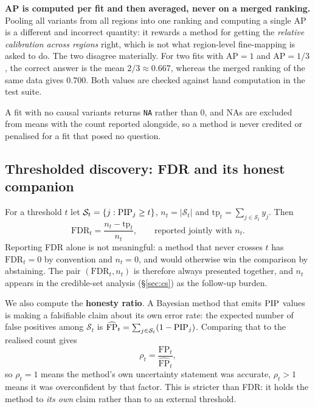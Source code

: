 \textbf{AP is computed per fit and then averaged, never on a merged ranking.}
Pooling all variants from all regions into one ranking and computing a single
AP is a different and incorrect quantity: it rewards a method for getting the
\emph{relative calibration across regions} right, which is not what
region-level fine-mapping is asked to do. The two disagree materially. For two
fits with $\mathrm{AP}=1$ and $\mathrm{AP}=1/3$, the correct answer is the mean
$2/3\approx0.667$, whereas the merged ranking of the same data gives $0.700$.
Both values are checked against hand computation in the test suite.

A fit with no causal variants returns \texttt{NA} rather than $0$, and NAs are
excluded from means with the count reported alongside, so a method is never
credited or penalised for a fit that posed no question.

\subsection{Thresholded discovery: FDR and its honest companion}\label{sec:fdr}

For a threshold $t$ let $\mathcal{S}_t=\{j:\mathrm{PIP}_j\ge t\}$, $n_t=|\mathcal{S}_t|$
and $\mathrm{tp}_t=\sum_{j\in\mathcal{S}_t}y_j$. Then
\begin{equation}
\mathrm{FDR}_t=\frac{n_t-\mathrm{tp}_t}{n_t},\qquad
\text{reported jointly with } n_t .
\end{equation}
Reporting FDR alone is not meaningful: a method that never crosses $t$ has
$\mathrm{FDR}_t=0$ by convention and $n_t=0$, and would otherwise win the
comparison by abstaining. The pair $(\mathrm{FDR}_t,n_t)$ is therefore always
presented together, and $n_t$ appears in the credible-set analysis
(\S\ref{sec:cs}) as the follow-up burden.

We also compute the \textbf{honesty ratio}. A Bayesian method that emits $\mathrm{PIP}$
values is making a falsifiable claim about its own error rate: the expected
number of false positives among $\mathcal{S}_t$ is
$\widehat{\mathrm{FP}}_t=\sum_{j\in\mathcal{S}_t}(1-\mathrm{PIP}_j)$. Comparing that to
the realised count gives
\begin{equation}
\rho_t=\frac{\mathrm{FP}_t}{\widehat{\mathrm{FP}}_t},
\end{equation}
so $\rho_t=1$ means the method's own uncertainty statement was accurate,
$\rho_t>1$ means it was overconfident by that factor. This is stricter than
FDR: it holds the method to \emph{its own} claim rather than to an external
threshold.


